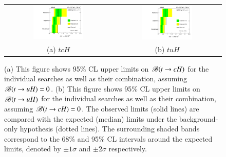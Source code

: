 \begin{figure}[h!]
\begin{center}
\begin{tabular}{@{}cc@{}}
\includegraphics[width=0.49\textwidth]{figures/tcH_Limits.pdf}&
\includegraphics[width=0.49\textwidth]{figures/tuH_Limits.pdf}\\
(a) $tcH$ & (b) $tuH$ \\
\end{tabular}
\caption{\small {(a) This figure shows 95\% CL upper limits on $\BR(t\to cH)$ for the individual searches as well as their
combination, assuming $\BR(t\to uH)=0$. (b) This figure shows 95\% CL upper limits on $\BR(t\to uH)$ for the individual searches as well as their
combination, assuming $\BR(t\to cH)=0$. The observed limits (solid lines) are compared with the 
expected (median) limits under the background-only hypothesis (dotted lines). The surrounding shaded bands correspond to the 68\% and 95\% CL intervals around the expected limits, 
denoted by $\pm 1\sigma$ and $\pm 2\sigma$ respectively.
}}
\label{fig:limits_combo_1D_hc} 
\end{center}
\end{figure}


